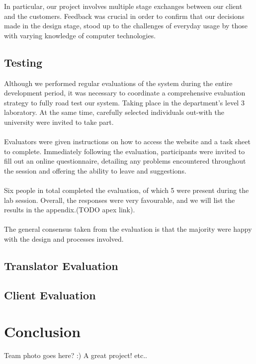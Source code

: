 \documentclass{l3proj}
\begin{document}
In particular, our project involves multiple stage exchanges between our client
and the customers. Feedback was crucial in order to confirm that our decisions
made in the design stage, stood up to the challenges of everyday usage by those
with varying knowledge of computer technologies.

\section{Testing}
\label{sect:testing}
Although we performed regular evaluations of the system during the entire development
period, it was necessary to coordinate a comprehensive evaluation strategy to
fully road test our system.
Taking place in the department's level 3 laboratory. At the same time, carefully
selected individuals out-with the university were invited to take part.\\
\\
Evaluators were given instructions on how to access the website and a task sheet
to complete. Immediately following the evaluation, participants were invited to
fill out an online questionnaire, detailing any problems encountered throughout the
session and offering the ability to leave and suggestions.\\
\\
Six people in total completed the evaluation, of which 5 were present during the
lab session. Overall, the responses were very favourable, and we will list the
results in the appendix.(TODO apex link).\\
\\ 
The general consensus taken from the evaluation is that the majority were
happy with the design and processes involved.
\section{Translator Evaluation}
\label{trans-eval}

\section{Client Evaluation}
\label{cli-eval}
\chapter{Conclusion}
\label{chap:concl}
Team photo goes here? :)
A great project! etc..

\end{document}
